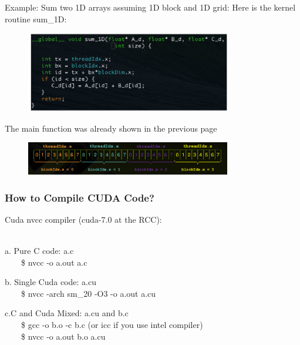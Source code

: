 \documentclass[xcolor={x11names,svgnames,dvipsnames}]{beamer}
\begin{document}
\begin{frame}
Example: Sum two 1D arrays assuming 1D block and 1D grid:
Here is the kernel routine sum\_1D:
 \begin{figure}
     \includegraphics[width=0.8\textwidth, height=0.4\textheight]{code2.png}
\end{figure}
The main function was already shown in the previous page
 \begin{figure}
     \includegraphics[width=0.8\textwidth, height=0.2\textheight]{thread.png}
\end{figure}

\end{frame}


\begin{frame}
\frametitle{How to Compile CUDA Code?}
Cuda nvcc compiler (cuda-7.0 at the RCC):\\
\\
\vspace{0.5cm}

a. Pure C code: a.c\\
\ \ \ \ \$ nvcc -o a.out a.c\\
\vspace{1cm}


b. Single Cuda code: a.cu\\
\ \ \ \ \$ nvcc -arch sm\_20 -O3 -o a.out a.cu\\
\vspace{1cm}


c.C and Cuda Mixed: a.cu and b.c\\
\ \ \ \ \$ gcc -o b.o -c b.c (or icc if you use intel compiler)\\
\ \ \ \ \$ nvcc -o a.out b.o a.cu\\
\end{frame}
\end{document}

